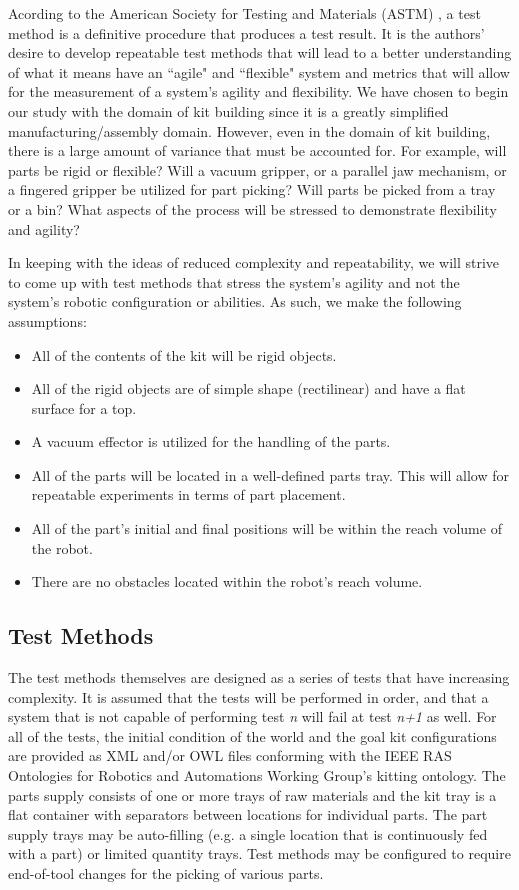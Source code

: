 Acording to the American Society for Testing and Materials (ASTM) \cite[p. vii]{ASTM99}, a test method is a
definitive procedure that produces a test result. It is the authors' desire to develop repeatable test methods that will
lead to a better understanding of what it means have an ``agile" and ``flexible" system and metrics that 
will allow for the measurement of a system's agility and flexibility. We have chosen to begin our study
with the domain of kit building since it is a greatly simplified manufacturing/assembly domain. However, 
even in the domain of kit building, there is a large amount of variance that must be accounted for. For
example, will parts be rigid or flexible? Will a vacuum gripper, or a parallel jaw mechanism, or a fingered 
gripper be utilized for part picking? Will parts be picked from a tray or a bin? What aspects of the
process will be stressed to demonstrate flexibility and agility?

In keeping with the ideas of reduced complexity and repeatability, we will strive to come up with test methods that stress
the system's agility and not the system's robotic configuration or abilities. As such, we make the following assumptions:
\begin{itemize}
	\item All of the contents of the kit will be rigid objects.
	\item All of the rigid objects are of simple shape (rectilinear) and have a flat surface for a top.
	\item A vacuum effector is utilized for the handling of the parts.
	\item All of the parts will be located in a well-defined parts tray. This will allow for repeatable experiments in terms of part placement.
	\item All of the part's initial and final positions will be within the reach volume of the robot.
	\item There are no obstacles located within the robot's reach volume.
\end{itemize}

\subsection{Test Methods}
The test methods themselves are designed as a series of tests that have increasing complexity. It is assumed that the tests will be performed
in order, and that a system that is not capable of performing test {\it n} will fail at test {\it n+1} as well. For all of the tests,
the initial condition of the world and the goal kit configurations are provided as XML and/or OWL files conforming with the IEEE RAS Ontologies
for Robotics and Automations Working Group's kitting ontology. The parts supply consists of one or more trays of raw materials and
the kit tray is a flat container with separators between locations for individual parts. The part supply trays may be auto-filling (e.g. 
a single location that is continuously fed with a part) or limited quantity trays. Test methods may be configured to require end-of-tool
changes for the picking of various parts.

